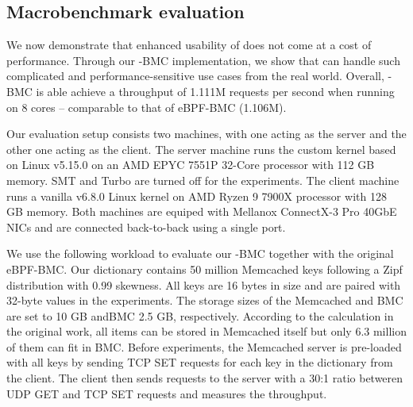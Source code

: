 

\subsection{Macrobenchmark evaluation}
\label{eval:macro}
We now demonstrate that enhanced usability of \projname{} does not come at a
    cost of performance.
Through our \projname{}-BMC implementation, we show that \projname{} can handle
    such complicated and performance-sensitive use cases from the real world.
Overall, \projname{}-BMC is able achieve a throughput of 1.111M requests per
    second when running on 8 cores -- comparable to that of eBPF-BMC (1.106M).

%

Our evaluation setup consists two machines, with one
    acting as the server and the other one acting as the client.
The server machine runs the \projname{} custom kernel based on Linux v5.15.0 on
    an AMD EPYC 7551P 32-Core processor with 112 GB memory.
SMT and Turbo are turned off for the experiments.
The client machine runs a vanilla v6.8.0 Linux kernel on AMD Ryzen 9 7900X
    processor with 128 GB memory.
Both machines are equiped with Mellanox ConnectX-3 Pro 40GbE NICs and are
    connected back-to-back using a single port.


We use the following workload to evaluate our \projname{}-BMC together with the
    original eBPF-BMC.
Our dictionary contains 50 million Memcached keys following a Zipf
    distribution with 0.99 skewness.
All keys are 16 bytes in size and are paired with 32-byte values in the
    experiments.
The storage sizes of the Memcached and BMC are set to 10 GB andBMC 2.5 GB,
    respectively.
According to the calculation in the original work, all items
    can be stored in Memcached itself but only 6.3 million of them can fit in
    BMC.
Before experiments, the Memcached server is pre-loaded with all keys by
    sending TCP SET requests for each key in the dictionary from the client.
The client then sends requests to the server with a 30:1 ratio betweren UDP GET and
    TCP SET requests and measures the throughput.

